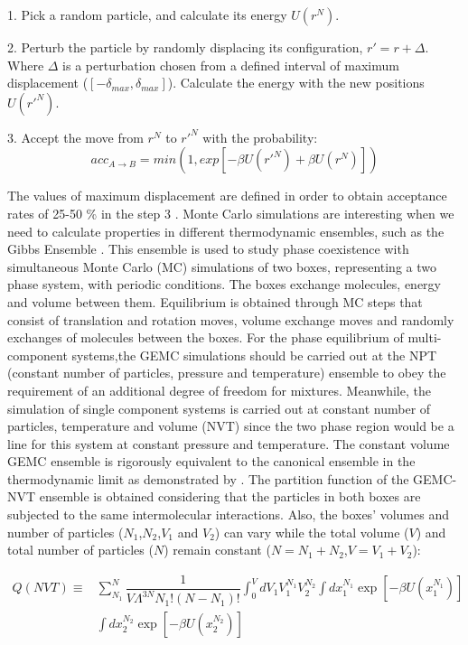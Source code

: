 	1. Pick a random particle, and calculate its energy $U(r^{N})$.
	
	2. Perturb the particle by randomly displacing  its configuration, $r' = r +\Delta$. Where $\Delta$ is a perturbation chosen from a defined interval of maximum displacement ($[- \delta _{max},\delta _{max}]$). Calculate the energy with the new positions $U(r'^{N})$.
	
	3. Accept the move from $r^{N}$ to $r'^{N}$ with the probability:
	\begin{equation}
	acc_{A \rightarrow B} = min(1,exp[-\beta U(r'^{N}) + \beta U(r^{N}) ])
	\end{equation}
	
	The values of maximum displacement are defined in order to obtain acceptance rates of 25-50 \% in the step 3   \cite{Frenkel2013}. Monte Carlo simulations are interesting when we need to calculate properties in different thermodynamic ensembles, such as the Gibbs Ensemble \cite{papa1987}. This ensemble  is used to study phase coexistence with simultaneous Monte Carlo (MC) simulations of two boxes,  representing a two phase system, with periodic conditions. The boxes exchange molecules, energy and volume between them. Equilibrium is obtained through MC steps that consist of translation and rotation moves, volume exchange moves and randomly exchanges of molecules between the boxes. For the phase equilibrium of multi-component systems,the GEMC simulations should be carried out at the NPT (constant number of particles, pressure and temperature) ensemble to obey the requirement of an additional degree of freedom for mixtures. Meanwhile, the simulation of single component systems is carried out at constant number of particles, temperature and volume (NVT) since the two phase region would be a line for this system at constant pressure and temperature. The constant volume GEMC ensemble is rigorously equivalent to the canonical ensemble in the thermodynamic limit as demonstrated by . The partition function of the GEMC-NVT ensemble is obtained considering that the particles in both boxes are subjected to the same intermolecular interactions. Also, the boxes’ volumes and number of particles ($N_{1}$,$N_{2}$,$V_{1}$ and $V_{2}$) can vary while the total volume ($V$) and total number of particles ($N$) remain constant ($N = N_{1} + N_{2}$,$V = V_{1} + V_{2}$):
	
	\begin{equation}
	\begin{aligned}
	Q(NVT) {} \equiv & \sum_{N_{1}}^{N} \dfrac{1}{V \Lambda ^{3N} N_{1}!(N-N_{1})!} \int_{0}^{V} dV_{1} V_{1}^{N_{1}} V_{2}^{N_{2}} \int dx_{1}^{N_{1}} \exp[-\beta U(x_{1}^{N_{1}})] \\
	& \int dx_{2}^{N_{2}} \exp[-\beta U(x_{2}^{N_{2}})]
	\end{aligned}
	\label{eqn:gepart}
	\end{equation}
	
